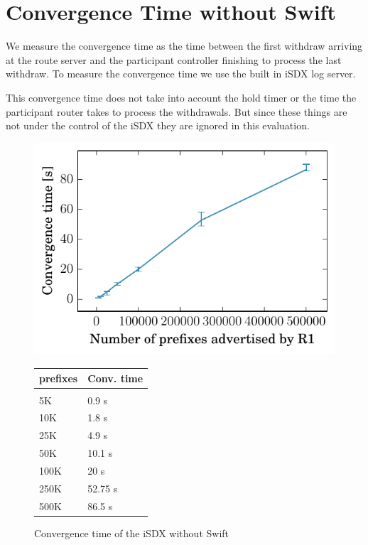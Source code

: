 \section{\label{chapter4:Convergence time without Swift}Convergence Time without Swift}

We measure the convergence time as the time between the first withdraw arriving at the route server and the participant controller finishing to process the last withdraw. To measure the convergence time we use the built in iSDX log server.

This convergence time does not take into account the hold timer or the time the participant router takes to process the withdrawals. But since these things are not under the control of the iSDX they are ignored in this evaluation.

\begin{figure}
\centering
\begin{minipage}[t]{.4\textwidth}
\centering
\vspace{0pt}
\includegraphics[scale = 1]{Figures/noswift.pdf}
\caption{Convergence time of the iSDX without Swift}
\label{fig:noswift}
\end{minipage}\hfill
\begin{minipage}[t]{.4\textwidth}
\centering
\vspace{0pt}
\begin{tabular}{@{}ll@{}}
	\\
	prefixes & Conv. time \\
	\hline
	\\
    5K & 0.9 s  \\
    10K & 1.8 s   \\
    25K & 4.9 s   \\
    50K & 10.1 s  \\
    100K & 20 s \\
    250K & 52.75 s   \\
    500K & 86.5 s  \\
\end{tabular}
\end{minipage}
\end{figure}

